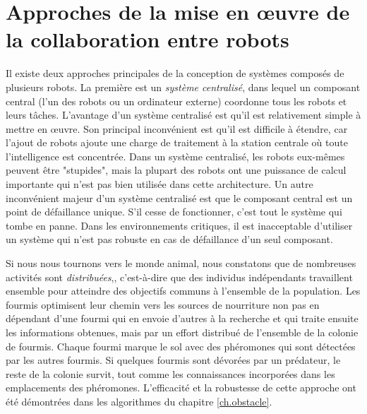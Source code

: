 \section{Approches de la mise en œuvre de la collaboration entre robots}

Il existe deux approches principales de la conception de systèmes composés de plusieurs robots. La première est un \textit{système centralisé}, dans lequel un composant central (l'un des robots ou un ordinateur externe) coordonne tous les robots et leurs tâches. L'avantage d'un système centralisé est qu'il est relativement simple à mettre en œuvre. Son principal inconvénient est qu'il est difficile à étendre, car l'ajout de robots ajoute une charge de traitement à la station centrale où toute l'intelligence est concentrée. Dans un système centralisé, les robots eux-mêmes peuvent être "stupides", mais la plupart des robots ont une puissance de calcul importante qui n'est pas bien utilisée dans cette architecture. Un autre inconvénient majeur d'un système centralisé est que le composant central est un point de défaillance unique. S'il cesse de fonctionner, c'est tout le système qui tombe en panne. Dans les environnements critiques, il est inacceptable d'utiliser un système qui n'est pas robuste en cas de défaillance d'un seul composant.

Si nous nous tournons vers le monde animal, nous constatons que de nombreuses activités sont \emph{distribuées},, c'est-à-dire que des individus indépendants travaillent ensemble pour atteindre des objectifs communs à l'ensemble de la population. Les fourmis optimisent leur chemin vers les sources de nourriture non pas en dépendant d'une fourmi qui en envoie d'autres à la recherche et qui traite ensuite les informations obtenues, mais par un effort distribué de l'ensemble de la colonie de fourmis. Chaque fourmi marque le sol avec des phéromones qui sont détectées par les autres fourmis. Si quelques fourmis sont dévorées par un prédateur, le reste de la colonie survit, tout comme les connaissances incorporées dans les emplacements des phéromones. L'efficacité et la robustesse de cette approche ont été démontrées dans les algorithmes du chapitre \ref{ch.obstacle}.


